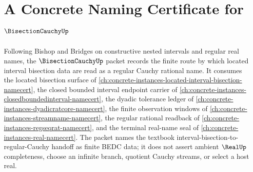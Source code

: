 \chapter{A Concrete Naming Certificate for $\BisectionCauchyUp$}
\label{ch:concrete-instances-bisection-cauchy-namecert}

Following Bishop and Bridges on constructive nested intervals and regular real names, the $\BisectionCauchyUp$ packet records the finite route by which located interval bisection data are read as a regular Cauchy rational name. It consumes the located bisection surface of \autoref{ch:concrete-instances-located-interval-bisection-namecert}, the closed bounded interval endpoint carrier of \autoref{ch:concrete-instances-closedboundedinterval-namecert}, the dyadic tolerance ledger of \autoref{ch:concrete-instances-dyadicratcore-namecert}, the finite observation windows of \autoref{ch:concrete-instances-streamname-namecert}, the regular rational readback of \autoref{ch:concrete-instances-regseqrat-namecert}, and the terminal real-name seal of \autoref{ch:concrete-instances-real-namecert}. The packet names the textbook interval-bisection-to-regular-Cauchy handoff as finite BEDC data; it does not assert ambient $\RealUp$ completeness, choose an infinite branch, quotient Cauchy streams, or select a host real.


